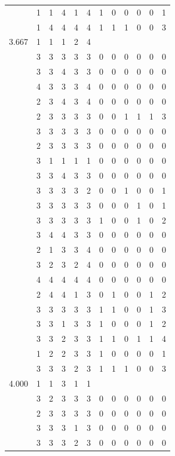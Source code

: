 \documentclass[]{book}
\theoremstyle{definition}
\theoremstyle{definition}
\theoremstyle{definition}
\theoremstyle{remark}
\begin{document}
\begin{table}
{\begin{tabular}[t]{rrrrrrrrrrrr}
 & 1 & 1 & 4 & 1 & 4 & 1 & 0 & 0 & 0 & 0 & 1\\
 & 1 & 4 & 4 & 4 & 4 & 1 & 1 & 1 & 0 & 0 & 3\\
3.667 & 1 & 1 & 1 & 2 & 4 &  &  &  &  &  & \\
 & 3 & 3 & 3 & 3 & 3 & 0 & 0 & 0 & 0 & 0 & 0\\
 & 3 & 3 & 4 & 3 & 3 & 0 & 0 & 0 & 0 & 0 & 0\\
 & 4 & 3 & 3 & 3 & 4 & 0 & 0 & 0 & 0 & 0 & 0\\
 & 2 & 3 & 4 & 3 & 4 & 0 & 0 & 0 & 0 & 0 & 0\\
 & 2 & 3 & 3 & 3 & 3 & 0 & 0 & 1 & 1 & 1 & 3\\
 & 3 & 3 & 3 & 3 & 3 & 0 & 0 & 0 & 0 & 0 & 0\\
 & 2 & 3 & 3 & 3 & 3 & 0 & 0 & 0 & 0 & 0 & 0\\
 & 3 & 1 & 1 & 1 & 1 & 0 & 0 & 0 & 0 & 0 & 0\\
 & 3 & 3 & 4 & 3 & 3 & 0 & 0 & 0 & 0 & 0 & 0\\
 & 3 & 3 & 3 & 3 & 2 & 0 & 0 & 1 & 0 & 0 & 1\\
 & 3 & 3 & 3 & 3 & 3 & 0 & 0 & 0 & 1 & 0 & 1\\
 & 3 & 3 & 3 & 3 & 3 & 1 & 0 & 0 & 1 & 0 & 2\\
 & 3 & 4 & 4 & 3 & 3 & 0 & 0 & 0 & 0 & 0 & 0\\
 & 2 & 1 & 3 & 3 & 4 & 0 & 0 & 0 & 0 & 0 & 0\\
 & 3 & 2 & 3 & 2 & 4 & 0 & 0 & 0 & 0 & 0 & 0\\
 & 4 & 4 & 4 & 4 & 4 & 0 & 0 & 0 & 0 & 0 & 0\\
 & 2 & 4 & 4 & 1 & 3 & 0 & 1 & 0 & 0 & 1 & 2\\
 & 3 & 3 & 3 & 3 & 3 & 1 & 1 & 0 & 0 & 1 & 3\\
 & 3 & 3 & 1 & 3 & 3 & 1 & 0 & 0 & 0 & 1 & 2\\
 & 3 & 3 & 2 & 3 & 3 & 1 & 1 & 0 & 1 & 1 & 4\\
 & 1 & 2 & 2 & 3 & 3 & 1 & 0 & 0 & 0 & 0 & 1\\
 & 3 & 3 & 3 & 2 & 3 & 1 & 1 & 1 & 0 & 0 & 3\\
4.000 & 1 & 1 & 3 & 1 & 1 &  &  &  &  &  & \\
 & 3 & 2 & 3 & 3 & 3 & 0 & 0 & 0 & 0 & 0 & 0\\
 & 2 & 3 & 3 & 3 & 3 & 0 & 0 & 0 & 0 & 0 & 0\\
 & 3 & 3 & 3 & 1 & 3 & 0 & 0 & 0 & 0 & 0 & 0\\
 & 3 & 3 & 3 & 2 & 3 & 0 & 0 & 0 & 0 & 0 & 0\\

\end{tabular}}
\end{table}
\end{document}
